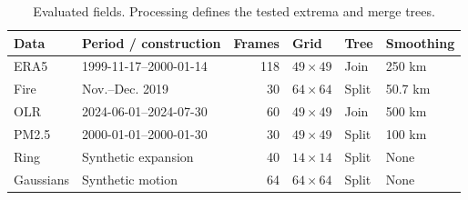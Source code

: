 \begin{table}[H]
\caption{Evaluated fields. Processing defines the tested extrema and merge trees.}\label{tab:data}
\centering\footnotesize
\setlength{\tabcolsep}{3pt}
\begin{tabular}{llrlll}\toprule
Data & Period / construction & Frames & Grid & Tree & Smoothing\\\midrule
ERA5 & 1999-11-17--2000-01-14 & 118 & $49\times49$ & Join & 250 km\\
Fire & Nov.--Dec. 2019 & 30 & $64\times64$ & Split & 50.7 km\\
OLR & 2024-06-01--2024-07-30 & 60 & $49\times49$ & Join & 500 km\\
PM2.5 & 2000-01-01--2000-01-30 & 30 & $49\times49$ & Split & 100 km\\
Ring & Synthetic expansion & 40 & $14\times14$ & Split & None\\
Gaussians & Synthetic motion & 64 & $64\times64$ & Split & None\\
\bottomrule\end{tabular}
\par{}
\end{table}
